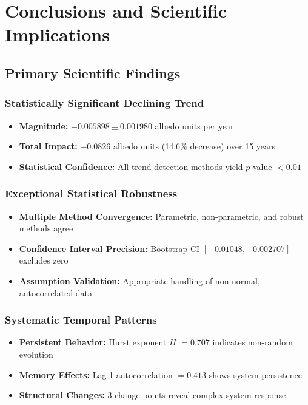 \documentclass[12pt,a4paper]{article}
\newcommand{\pvalue}{$p$-value}
\newcommand{\hurst}{$H$}
\begin{document}
\section{Conclusions and Scientific Implications}

\subsection{Primary Scientific Findings}

\subsubsection{Statistically Significant Declining Trend}
\begin{itemize}
    \item \textbf{Magnitude:} $-0.005898 \pm 0.001980$ albedo units per year
    \item \textbf{Total Impact:} $-0.0826$ albedo units (14.6\% decrease) over 15 years
    \item \textbf{Statistical Confidence:} All trend detection methods yield \pvalue{} $< 0.01$
\end{itemize}

\subsubsection{Exceptional Statistical Robustness}
\begin{itemize}
    \item \textbf{Multiple Method Convergence:} Parametric, non-parametric, and robust methods agree
    \item \textbf{Confidence Interval Precision:} Bootstrap CI $[-0.01048, -0.002707]$ excludes zero
    \item \textbf{Assumption Validation:} Appropriate handling of non-normal, autocorrelated data
\end{itemize}

\subsubsection{Systematic Temporal Patterns}
\begin{itemize}
    \item \textbf{Persistent Behavior:} Hurst exponent \hurst{} $= 0.707$ indicates non-random evolution
    \item \textbf{Memory Effects:} Lag-1 autocorrelation $= 0.413$ shows system persistence
    \item \textbf{Structural Changes:} 3 change points reveal complex system response
\end{itemize}
\end{document}
